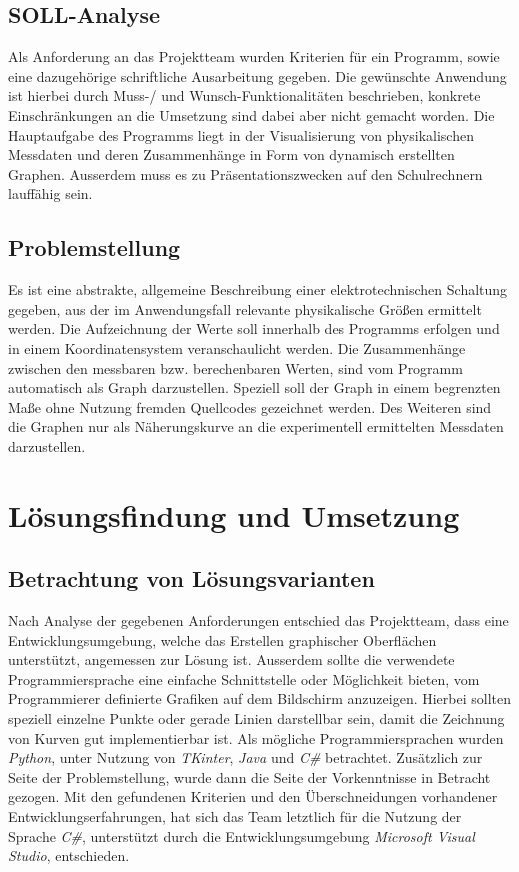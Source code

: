 \documentclass{article}
\begin{document}
\subsection{SOLL-Analyse}

    Als Anforderung an das Projektteam wurden Kriterien für ein Programm, sowie eine dazugehörige schriftliche Ausarbeitung gegeben. Die gewünschte Anwendung ist hierbei durch Muss-/ und Wunsch-Funktionalitäten beschrieben, konkrete Einschränkungen an die Umsetzung sind dabei aber nicht gemacht worden. Die Hauptaufgabe des Programms liegt in der Visualisierung von physikalischen Messdaten und deren Zusammenhänge in Form von dynamisch erstellten Graphen. Ausserdem muss es zu Präsentationszwecken auf den Schulrechnern lauffähig sein.

\subsection{Problemstellung}

    Es ist eine abstrakte, allgemeine Beschreibung einer elektrotechnischen Schaltung gegeben, aus der im Anwendungsfall relevante physikalische Größen ermittelt werden. Die Aufzeichnung der Werte soll innerhalb des Programms erfolgen und in einem Koordinatensystem veranschaulicht werden. Die Zusammenhänge zwischen den messbaren bzw. berechenbaren Werten, sind vom Programm automatisch als Graph darzustellen. Speziell soll der Graph in einem begrenzten Maße ohne Nutzung fremden Quellcodes gezeichnet werden. Des Weiteren sind die Graphen nur als Näherungskurve an die experimentell ermittelten Messdaten darzustellen.

\newpage
\section{Lösungsfindung und Umsetzung}

\subsection{Betrachtung von Lösungsvarianten}

    Nach Analyse der gegebenen Anforderungen entschied das Projektteam, dass eine Entwicklungsumgebung, welche das Erstellen graphischer Oberflächen unterstützt, angemessen zur Lösung ist. Ausserdem sollte die verwendete Programmiersprache eine einfache Schnittstelle oder Möglichkeit bieten, vom Programmierer definierte Grafiken auf dem Bildschirm anzuzeigen. Hierbei sollten speziell einzelne Punkte oder gerade Linien darstellbar sein, damit die Zeichnung von Kurven gut implementierbar ist.
    Als mögliche Programmiersprachen wurden \textit{\glqq Python\grqq{}}, unter Nutzung von \textit{\glqq TKinter\grqq{}}, \textit{\glqq Java\grqq{}}    und \textit{\glqq C\#\grqq{}} betrachtet.
    Zusätzlich zur Seite der Problemstellung, wurde dann die Seite der Vorkenntnisse in Betracht gezogen. Mit den gefundenen Kriterien und den Überschneidungen vorhandener Entwicklungserfahrungen, hat sich das Team letztlich für die Nutzung der Sprache \textit{\glqq C\#\grqq{}}, unterstützt durch die Entwicklungsumgebung \textit{\glqq Microsoft Visual Studio\grqq{}}, entschieden.
\end{document}
